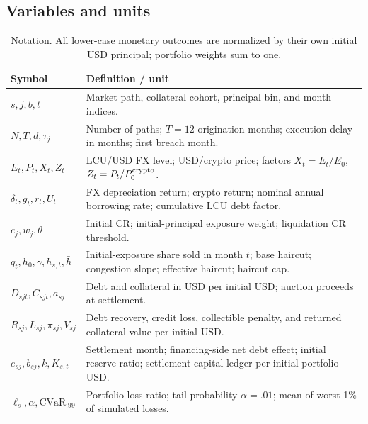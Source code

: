 \documentclass[11pt,a4paper]{article}
\begin{document}
\subsection{Variables and units}
\begin{table}[H]\centering\small
\caption{Notation. All lower-case monetary outcomes are normalized by their own initial USD principal; portfolio weights sum to one.}\label{tab:notation}
\begin{tabularx}{\linewidth}{p{28mm}X}\toprule
Symbol & Definition / unit\\\midrule
$s,j,b,t$ & Market path, collateral cohort, principal bin, and month indices.\\
$N,T,d,\tau_j$ & Number of paths; $T=12$ origination months; execution delay in months; first breach month.\\
$E_t,P_t,X_t,Z_t$ & LCU/USD FX level; USD/crypto price; factors $X_t=E_t/E_0$, $Z_t=P_t/P_0^{\rm crypto}$.\\
$\delta_t,g_t,r_t,U_t$ & FX depreciation return; crypto return; nominal annual borrowing rate; cumulative LCU debt factor.\\
$c_j,w_j,\theta$ & Initial CR; initial-principal exposure weight; liquidation CR threshold.\\
$q_t,h_0,\gamma,h_{s,t},\bar h$ & Initial-exposure share sold in month $t$; base haircut; congestion slope; effective haircut; haircut cap.\\
$D_{sjt},C_{sjt},a_{sj}$ & Debt and collateral in USD per initial USD; auction proceeds at settlement.\\
$R_{sj},L_{sj},\pi_{sj},V_{sj}$ & Debt recovery, credit loss, collectible penalty, and returned collateral value per initial USD.\\
$e_{sj},b_{sj},k,K_{s,t}$ & Settlement month; financing-side net debt effect; initial reserve ratio; settlement capital ledger per initial portfolio USD.\\
$\ell_s,\alpha,\mathrm{CVaR}_{.99}$ & Portfolio loss ratio; tail probability $\alpha=.01$; mean of worst 1\% of simulated losses.\\\bottomrule
\end{tabularx}\end{table}
\end{document}
